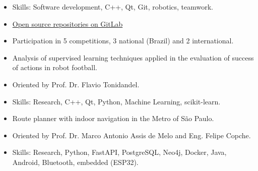 \documentclass[11pt,a4paper,ragged2e,withhyper]{altacv}
\begin{document}
\begin{paracol}{2}

\begin{itemize}
\item Skills: Software development, C++, Qt, Git, robotics, teamwork.
\item \href{https://gitlab.com/robofei/ssl}{Open source repositories on GitLab}
\item Participation in 5 competitions, 3 national (Brazil) and 2 international.
\end{itemize}


\begin{itemize}
\item Analysis of supervised learning techniques applied in the evaluation of success of actions in robot football.
\item Oriented by Prof. Dr. Flavio Tonidandel.
\item Skills: Research, C++, Qt, Python, Machine Learning, scikit-learn.
\end{itemize}

\divider

\begin{itemize}
  \item Route planner with indoor navigation in the Metro of São Paulo.
  \item Oriented by Prof. Dr. Marco Antonio Assis de Melo and Eng. Felipe Copche.
  \item Skills: Research, Python, FastAPI, PostgreSQL, Neo4j, Docker, Java, Android, Bluetooth, embedded (ESP32).
\end{itemize}
  
\medskip




\end{paracol}
\end{document}
